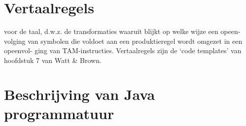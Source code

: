 \documentclass[]{article}
\begin{document}

%
%



%
%
%


\newpage
\section{Vertaalregels}
voor de taal, d.w.z. de transformaties waaruit blijkt op welke wijze een opeen-
volging van symbolen die voldoet aan een produktieregel wordt omgezet in een opeenvol-
ging van TAM-instructies. Vertaalregels zijn de ‘code templates’ van hoofdstuk 7 van Watt
\& Brown.

\newpage
\section{Beschrijving van Java programmatuur}
%
%
\end{document}
